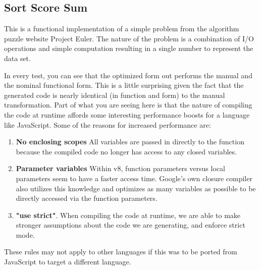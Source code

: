 \subsection{Sort Score Sum}
This is a functional implementation of a simple problem from the algorithm puzzle website Project Euler.  The nature of the problem is a combination of I/O operations and simple computation resulting in a single number to represent the data set. \cite{euler05}

In every test, you can see that the optimized form out performs the manual and the nominal functional form.  This is a little surprising given the fact that the generated code is nearly identical (in function and form) to the manual transformation.  Part of what you are seeing here is that the nature of compiling the code at runtime affords some interesting performance boosts for a language like JavaScript. Some of the reasons for increased performance are:
\begin{enumerate}
  \item \textbf{No enclosing scopes} All variables are passed in directly to the function because the compiled code no longer has access to any closed variables.
  \item \textbf{Parameter variables}  Within v8, function parameters versus local parameters seem to have a faster access time.  Google's own closure compiler also utilizes this knowledge and optimizes as many variables as possible to be directly accessed via the function parameters. 
  \item \textbf{"use strict"}.  When compiling the code at runtime, we are able to make stronger assumptions about the code we are generating, and enforce strict mode.     
\end{enumerate}

These rules may not apply to other languages if this was to be ported from JavaScript to target a different language.